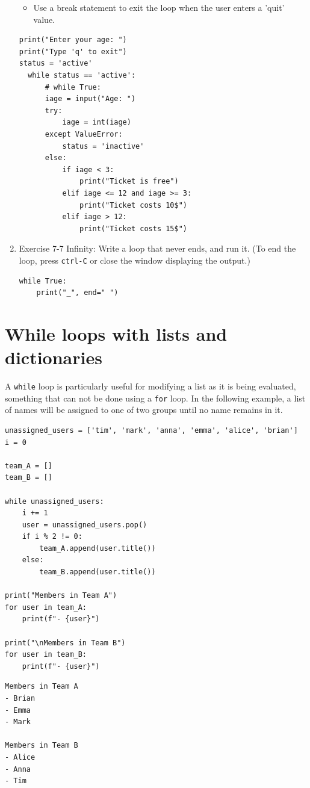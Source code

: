 \documentclass[10pt]{book}
\begin{document}
\begin{enumerate}
\begin{itemize}
\item Use a break statement to exit the loop when the user enters a 'quit' value.
\end{itemize}
\begin{verbatim}
print("Enter your age: ")
print("Type 'q' to exit")
status = 'active'
  while status == 'active':
      # while True:
      iage = input("Age: ")
      try:
          iage = int(iage)
      except ValueError:
          status = 'inactive'
      else:
          if iage < 3:
              print("Ticket is free")
          elif iage <= 12 and iage >= 3:
              print("Ticket costs 10$")
          elif iage > 12:
              print("Ticket costs 15$")
\end{verbatim}
\item Exercise 7-7 Infinity:
\label{sec:org961583b}
Write a loop that never ends, and run it. (To end the loop, press \texttt{ctrl-C} or close the window displaying the output.)
\begin{verbatim}
while True:
    print("_", end=" ")
\end{verbatim}
\end{enumerate}
\section{While loops with lists and dictionaries}
\label{sec:orga4bb637}
A \texttt{while} loop is particularly useful for modifying a list as it is being evaluated, something that can not be done using a \texttt{for} loop.  In the following example, a list of names will be assigned to one of two groups until no name remains in it.

\label{orgca5b532}
\begin{verbatim}
unassigned_users = ['tim', 'mark', 'anna', 'emma', 'alice', 'brian']
i = 0

team_A = []
team_B = []

while unassigned_users:
    i += 1
    user = unassigned_users.pop()
    if i % 2 != 0:
        team_A.append(user.title())
    else:
        team_B.append(user.title())    

print("Members in Team A")
for user in team_A:
    print(f"- {user}")

print("\nMembers in Team B")
for user in team_B:
    print(f"- {user}")
\end{verbatim}

\label{orgf970f23}
\begin{verbatim}
Members in Team A
- Brian
- Emma
- Mark

Members in Team B
- Alice
- Anna
- Tim
\end{verbatim}
\end{document}
